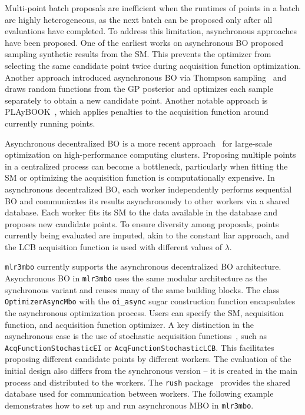 \documentclass[12pt,letterpaper]{article}
\begin{document}
Multi-point batch proposals are inefficient when the runtimes of points in a batch are highly heterogeneous, as the next batch can be proposed only after all evaluations have completed. 
To address this limitation, asynchronous approaches have been proposed.
One of the earliest works on asynchronous BO proposed sampling synthetic results from the SM\cite{snoek2012}.
This prevents the optimizer from selecting the same candidate point twice during acquisition function optimization.
Another approach introduced asynchronous BO via Thompson sampling~\cite{kandasamy2018} and draws random functions from the GP posterior and optimizes each sample separately to obtain a new candidate point.
Another notable approach is PLAyBOOK~\cite{alvi2019}, which applies penalties to the acquisition function around currently running points.

Asynchronous decentralized BO is a more recent approach~\cite{egele2023} for large-scale optimization on high-performance computing clusters.
Proposing multiple points in a centralized process can become a bottleneck, particularly when fitting the SM or optimizing the acquisition function is computationally expensive.
In asynchronous decentralized BO, each worker independently performs sequential BO and communicates its results asynchronously to other workers via a shared database.
Each worker fits its SM to the data available in the database and proposes new candidate points.
To ensure diversity among proposals, points currently being evaluated are imputed, akin to the constant liar approach, and the LCB acquisition function is used with different values of $\lambda$.

\texttt{mlr3mbo} currently supports the asynchronous decentralized BO architecture.
Asynchronous BO in \texttt{mlr3mbo} uses the same modular architecture as the synchronous variant and reuses many of the same building blocks.
The class \texttt{OptimizerAsyncMbo} with the \texttt{oi\_async} sugar construction function encapsulates the asynchronous optimization process.
Users can specify the SM, acquisition function, and acquisition function optimizer.
A key distinction in the asynchronous case is the use of stochastic acquisition functions~\cite{egele2023}, such as \texttt{AcqFunctionStochasticEI} or \texttt{AcqFunctionStochasticLCB}.
This facilitates proposing different candidate points by different workers.
The evaluation of the initial design also differs from the synchronous version -- it is created in the main process and distributed to the workers.
The \texttt{rush} package~\cite{becker2025} provides the shared database used for communication between workers.
The following example demonstrates how to set up and run asynchronous MBO in \texttt{mlr3mbo}.
\end{document}
